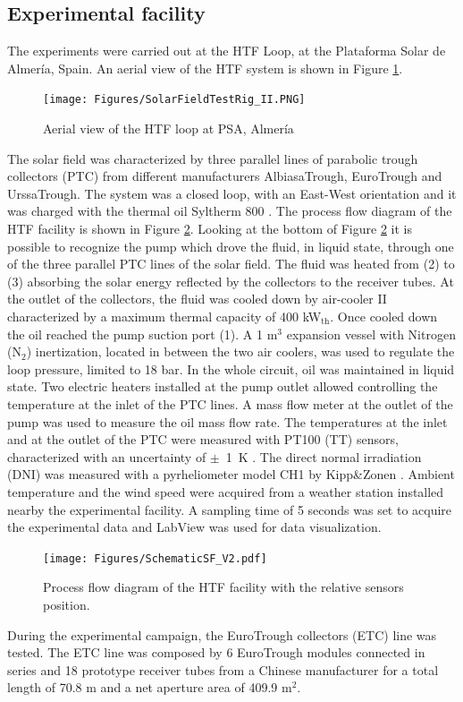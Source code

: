 \documentclass[final,3p,times,review]{elsarticle}
\begin{document}
\subsection{Experimental facility}
%
The experiments were carried out at the HTF Loop, at the Plataforma Solar de Almer\' ia, Spain. An aerial view of the HTF system is shown in Figure \ref{fig:PTTL_photo}.
%
\begin{figure}[h!]
\centering
\texttt{[image: Figures/SolarFieldTestRig\_II.PNG]}
\caption{Aerial view of the HTF loop at PSA, Almer\' ia}
\label{fig:PTTL_photo}
\end{figure}
%
The solar field was characterized by three parallel lines of parabolic trough collectors (PTC) from different manufacturers AlbiasaTrough, EuroTrough and UrssaTrough. The system was a closed loop, with an East-West orientation and it was charged with the thermal oil Syltherm 800 \cite{DowOilandGas1997}. The process flow diagram of the HTF facility is shown in Figure \ref{fig:PTTL_PI}. Looking at the bottom of Figure \ref{fig:PTTL_PI} it is possible to recognize the pump which drove the fluid, in liquid state, through one of the three parallel PTC lines of the solar field. The fluid was heated from (2) to (3) absorbing the solar energy reflected by the collectors to the receiver tubes. At the outlet of the collectors, the fluid was cooled down by air-cooler II characterized by a maximum thermal capacity of 400 kW$_\mathrm{th}$. Once cooled down the oil reached the pump suction port (1). A 1 m$^3$ expansion vessel with Nitrogen (N$_\mathrm{2}$) inertization, located in between the two air coolers, was used to regulate the loop pressure, limited to 18 bar. In the whole circuit, oil was maintained in liquid state. Two electric heaters installed at the pump outlet allowed controlling the temperature at the inlet of the PTC lines. A mass flow meter at the outlet of the pump was used to measure the oil mass flow rate. The temperatures at the inlet and at the outlet of the PTC were measured with PT100 (TT) sensors, characterized with an uncertainty of $\pm$~1~K \cite{Sallaberry2017}. The direct normal irradiation (DNI) was measured with a pyrheliometer model CH1 by Kipp\&Zonen \cite{Kipp1997}. Ambient temperature and the wind speed were acquired from a weather station installed nearby the experimental facility. A sampling time of 5 seconds was set to acquire the experimental data and LabView was used for data visualization. 
%
\begin{figure}[h!]
\centering
\texttt{[image: Figures/SchematicSF\_V2.pdf]}
\caption{Process flow diagram of the HTF facility with the relative sensors position.}
\label{fig:PTTL_PI}
\end{figure}
%
During the experimental campaign, the EuroTrough collectors (ETC) line was tested. The ETC line was composed by 6 EuroTrough modules connected in series and 18 prototype receiver tubes from a Chinese manufacturer for a total length of 70.8 m and a net aperture area of 409.9 m$^2$.
%
\end{document}
